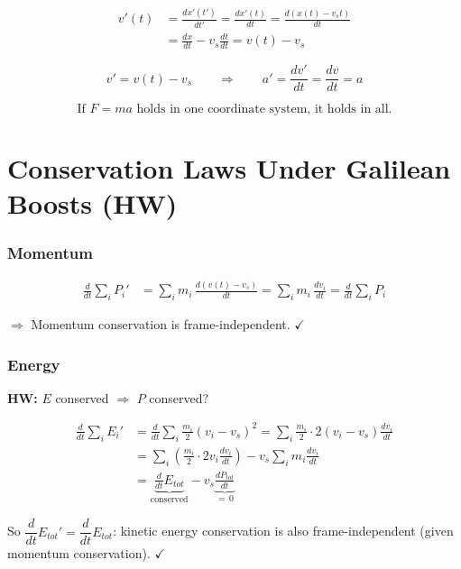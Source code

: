 \begin{align*}
  v'(t) &= \frac{dx'(t')}{dt'} = \frac{dx'(t)}{dt} = \frac{d(x(t)-v_s t)}{dt} \\[4pt]
        &= \frac{dx}{dt} - v_s\frac{dt}{dt} = v(t) - v_s
\end{align*}

\[
  v' = v(t) - v_s \qquad \Rightarrow \qquad a' = \frac{dv'}{dt} = \frac{dv}{dt} = a
\]

\[
  \boxed{\text{If } F=ma \text{ holds in one coordinate system, it holds in all.}}
\]

\section*{Conservation Laws Under Galilean Boosts (HW)}

\subsubsection*{Momentum}

\begin{align*}
  \frac{d}{dt}\sum_i P_i'
    &= \sum_i m_i\,\frac{d(v(t)-v_s)}{dt}
     = \sum_i m_i\,\frac{dv_i}{dt}
     = \frac{d}{dt}\sum_i P_i
\end{align*}

$\Rightarrow$ Momentum conservation is frame-independent. $\checkmark$

\subsubsection*{Energy}

\begin{tcolorbox}
\textbf{HW:} $E$ conserved $\Rightarrow$ $P$ conserved?

\begin{align*}
  \frac{d}{dt}\sum_i E_i'
  &= \frac{d}{dt}\sum_i \frac{m_i}{2}(v_i - v_s)^2
   = \sum_i \frac{m_i}{2}\cdot 2(v_i - v_s)\frac{dv_i}{dt} \\[4pt]
  &= \sum_i\!\left(\frac{m_i}{2}\cdot 2v_i\frac{dv_i}{dt}\right) - v_s\sum_i m_i\frac{dv_i}{dt} \\[4pt]
  &= \underbrace{\frac{d}{dt}E_{tot}}_{\text{conserved}}
   - v_s\underbrace{\frac{dP_{tot}}{dt}}_{=\,0}
\end{align*}

So $\dfrac{d}{dt}E_{tot}' = \dfrac{d}{dt}E_{tot}$:
kinetic energy conservation is also frame-independent (given momentum conservation). $\checkmark$
\end{tcolorbox}


